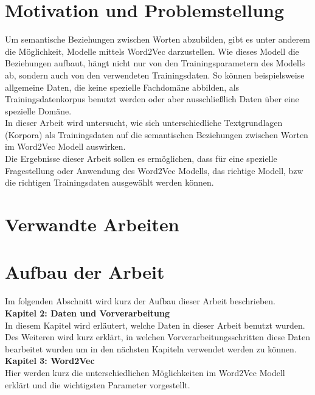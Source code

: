 \documentclass[12pt,a4paper]{report}
\begin{document}
	\section{Motivation und Problemstellung}
	  
	
	Um semantische Beziehungen zwischen Worten abzubilden, gibt es unter anderem die Möglichkeit, Modelle mittels Word2Vec darzustellen. Wie dieses Modell die Beziehungen aufbaut, hängt nicht nur von den Trainingsparametern des Modells ab, sondern auch von den verwendeten Trainingsdaten. So können beispielsweise allgemeine Daten, die keine spezielle Fachdomäne abbilden, als Trainingsdatenkorpus benutzt werden oder aber ausschließlich Daten über eine spezielle Domäne. \\		
	In dieser Arbeit wird untersucht, wie sich unterschiedliche Textgrundlagen (Korpora) als Trainingsdaten auf die semantischen Beziehungen zwischen Worten im Word2Vec Modell auswirken. \\
	Die Ergebnisse dieser Arbeit sollen es ermöglichen, dass für eine spezielle Fragestellung oder Anwendung des Word2Vec Modells, das richtige Modell, bzw die richtigen Trainingsdaten ausgewählt werden können.\\
	


	\section{Verwandte Arbeiten}
	
	
	
	
	\newpage
	\section{Aufbau der Arbeit}
	Im folgenden Abschnitt wird kurz der Aufbau dieser Arbeit beschrieben.\\
	
	\textbf{Kapitel 2: Daten und Vorverarbeitung}\\
	In diesem Kapitel wird erläutert, welche Daten in dieser Arbeit benutzt wurden. Des Weiteren wird kurz erklärt, in welchen Vorverarbeitungsschritten diese Daten bearbeitet wurden um in den nächsten Kapiteln verwendet werden zu können.\\
	
	\textbf{Kapitel 3: Word2Vec}\\
	Hier werden kurz die unterschiedlichen Möglichkeiten im Word2Vec Modell erklärt und die wichtigsten Parameter vorgestellt.\\
	
\end{document}
